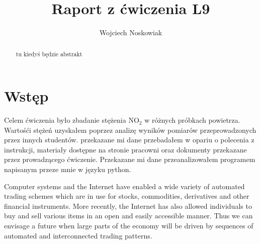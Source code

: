 \documentclass{comjnl}
\begin{document}
\title[Raport z ćwiczenia L9]{Raport z ćwiczenia L9}
\author{Wojciech Noskowiak}

 




\begin{abstract}
tu kiedyś będzie abstrakt
\end{abstract}

\maketitle



\section{Wstęp}

Celem ćwiczenia było zbadanie stężenia $\text{NO}_{\text{2}}$ w różnych próbkach powietrza. Wartośći stężeń uzyskałem poprzez analizę wyników pomiarów przeprowadzonych przez innych studentów. przekazane mi dane przebadałem w opariu o polecenia z instrukcji, materiały dostępne na stronie pracowni oraz dokumenty przekazane przez prowadzącego ćwiczenie. Przekazane mi dane przeanalizowałem programem napisanym przeze mnie w języku python. 


Computer systems and the Internet have enabled a wide variety of
automated trading schemes which are in use for stocks,
commodities, derivatives and other financial instruments. More
recently, the Internet has also allowed individuals to buy and
sell various items in an open and easily accessible manner. Thus
we can envisage a future when large parts of the economy will be
driven by sequences of automated and interconnected trading
patterns.
\end{document}
